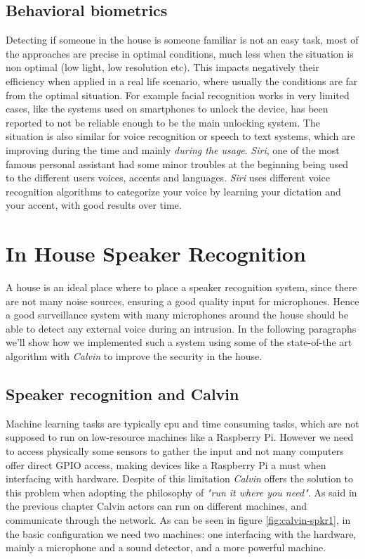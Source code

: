 \subsection{Behavioral biometrics}
Detecting if someone in the house is someone familiar is not an easy task, most
of the approaches are precise in optimal conditions, much less when the situation
is non optimal (low light, low resolution etc). This impacts negatively their efficiency
when applied in a real life scenario, where usually the conditions are far from the optimal
situation. For example facial recognition works in very limited cases, like the systems
used on smartphones to unlock the device, has been reported to not be reliable enough
to be the main unlocking system. The situation is also similar for voice recognition or
speech to text systems, which are improving during the time and mainly \textit{during the usage}.
\textit{Siri}, one of the most famous personal assistant had some minor troubles at the beginning
being used to the different users voices, accents and languages. \textit{Siri} uses
different voice recognition algorithms to categorize your voice by learning your
dictation and your accent, with good results over time.


\section{In House Speaker Recognition}

A house is an ideal place where to place a speaker recognition system,
since there are not many noise sources, ensuring a good quality input
for microphones. Hence a good surveillance system with many microphones around
the house should be able to detect any external voice during an intrusion. In the following
paragraphs we'll show how we implemented such a system using some of the state-of-the art
algorithm with \textit{Calvin} to improve the security in the house.

\subsection{Speaker recognition and Calvin}

Machine learning tasks are typically cpu and time consuming tasks, which
are not supposed to run on low-resource machines like a Raspberry Pi. However
we need to access physically some sensors to gather the input and not many computers
offer direct GPIO access, making devices like a Raspberry Pi a must when interfacing
with hardware. Despite of this limitation \textit{Calvin} offers the solution to this problem
when adopting the philosophy of \textit{"run it where you need"}. As said in the previous chapter
Calvin actors can run on different machines, and communicate through the network.
As can be seen in figure \ref{fig:calvin-spkr1}, in the basic configuration we need two machines:
one interfacing with the hardware, mainly a microphone and a sound detector, and a more powerful
machine.

